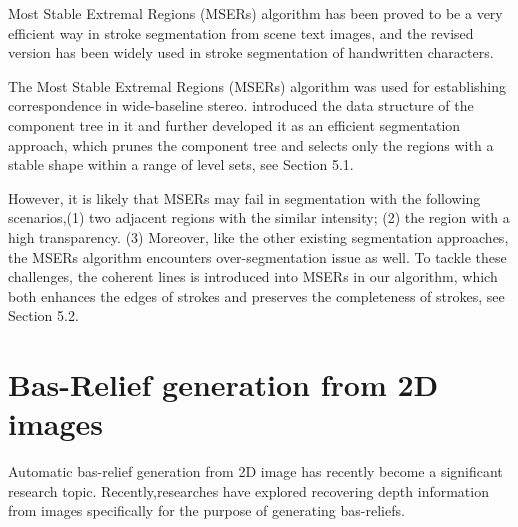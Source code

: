Most Stable Extremal Regions (MSERs) algorithm\cite{matas2004robust} has been proved to be a very efficient way in stroke segmentation from scene text images\cite{neumann2011text}\cite{gomez2013multi}, 
and the revised version has been widely used in stroke segmentation of handwritten characters\cite{gomez2016fast}.

The Most Stable Extremal Regions (MSERs) algorithm\cite{matas2004robust} was used for establishing correspondence in wide-baseline stereo.\cite{donoser2006efficient} introduced the data structure of the component tree in it and further developed it as an efficient segmentation approach, which prunes the component tree and selects only the regions with a stable shape within a range of level sets, see Section 5.1.

However, it is likely that MSERs may fail in segmentation with the following scenarios,\newline (1) two adjacent regions with the similar intensity; \newline (2) the region with a high transparency. \newline
(3) Moreover, like the other existing segmentation approaches, the MSERs algorithm encounters over-segmentation issue as well. To tackle these challenges, the coherent lines \cite{kang2007coherent} is introduced into MSERs in our algorithm, which both enhances the edges of strokes and preserves the completeness of strokes, see Section 5.2. 



\section{Bas-Relief generation from 2D images}
Automatic bas-relief generation from 2D image has recently become a significant research topic. Recently,researches have explored recovering depth information from images specifically for the purpose of generating bas-reliefs.\newline
